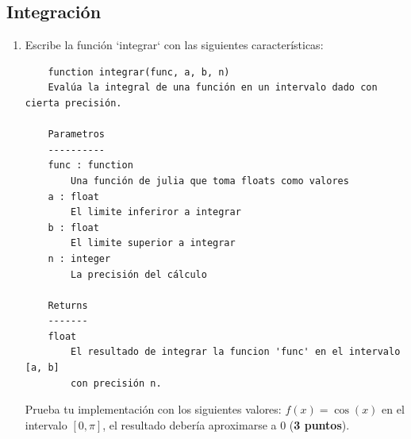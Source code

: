 \documentclass[a4paper,12pt]{article}
\begin{document}
\subsection*{Integración}
\begin{enumerate}
    \item Escribe la función `integrar` con las siguientes características:
    \begin{verbatim}
    function integrar(func, a, b, n)
    Evalúa la integral de una función en un intervalo dado con cierta precisión.
    
    Parametros
    ----------
    func : function
        Una función de julia que toma floats como valores
    a : float
        El limite inferiror a integrar
    b : float
        El limite superior a integrar
    n : integer
        La precisión del cálculo

    Returns
    -------
    float
        El resultado de integrar la funcion 'func' en el intervalo [a, b]
        con precisión n.
    \end{verbatim}

    Prueba tu implementación con los siguientes valores: $f(x) = \cos(x)$ en el intervalo $[0,\pi]$, el resultado debería aproximarse a $0$ (\textbf{3 puntos}).
\end{enumerate}
\end{document}
